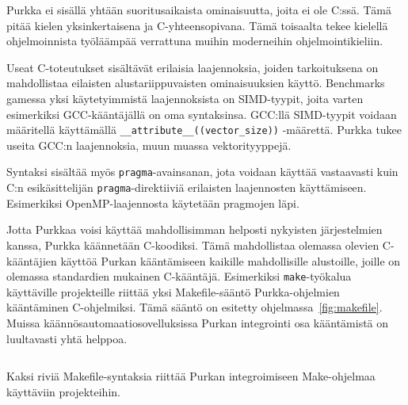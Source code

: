 
Purkka ei sisällä yhtään suoritusaikaista ominaisuutta, joita ei ole C:ssä.
Tämä pitää kielen yksinkertaisena ja C-yhteensopivana. Tämä toisaalta tekee
kielellä ohjelmoinnista työläämpää verrattuna muihin moderneihin
ohjelmointikieliin.

Useat C-toteutukset sisältävät erilaisia laajennoksia, joiden tarkoituksena on
mahdollistaa eilaisten alustariippuvaisten ominaisuuksien käyttö. Benchmarks
gamessa yksi käytetyimmistä laajennoksista on SIMD-tyypit, joita varten
esimerkiksi GCC-kääntäjällä on oma syntaksinsa. GCC:llä SIMD-tyypit voidaan
määritellä käyttämällä \texttt{\_\_attribute\_\_((vector\_size))} -määrettä.
Purkka tukee useita GCC:n laajennoksia, muun muassa vektorityyppejä.

Syntaksi sisältää myös \texttt{pragma}-avainsanan, jota voidaan käyttää
vastaavasti kuin C:n esikäsittelijän \texttt{pragma}-direktiiviä erilaisten
laajennosten käyttämiseen. Esimerkiksi OpenMP-laajennosta käytetään pragmojen
läpi.

Jotta Purkkaa voisi käyttää mahdollisimman helposti nykyisten järjestelmien
kanssa, Purkka käännetään C-koodiksi. Tämä mahdollistaa olemassa olevien
C-kääntäjien käyttöä Purkan kääntämiseen kaikille mahdollisille alustoille,
joille on olemassa standardien mukainen C-kääntäjä. Esimerkiksi
\texttt{make}-työkalua käyttäville projekteille riittää yksi Makefile-sääntö
Purkka-ohjelmien kääntäminen C-ohjelmiksi. Tämä sääntö on esitetty
ohjelmassa~\ref{fig:makefile}. Muissa käännösautomaatiosovelluksissa Purkan
integrointi osa kääntämistä on luultavasti yhtä helppoa.

\begin{listing}[ht!]
    \inputminted{Makefile}{koodi/Makefile.kieli}
    \caption{Kaksi riviä Makefile-syntaksia riittää Purkan integroimiseen
    Make-ohjelmaa käyttäviin projekteihin.}
    \label{fig:makefile}
\end{listing}

